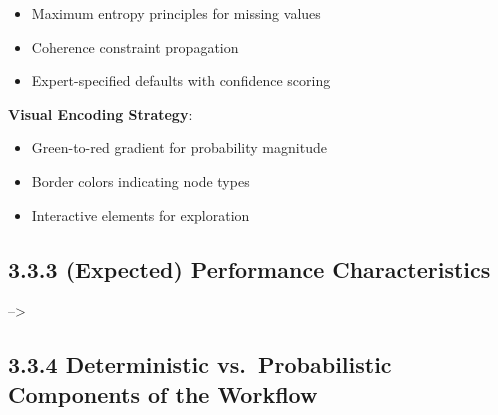 \documentclass[
  11pt,
  letterpaper,
]{book}
\providecommand{\tightlist}{%
  \setlength{\itemsep}{0pt}\setlength{\parskip}{0pt}}
\begin{document}
\begin{itemize}
\tightlist
\item
  Maximum entropy principles for missing values
\item
  Coherence constraint propagation
\item
  Expert-specified defaults with confidence scoring
\end{itemize}

\textbf{Visual Encoding Strategy}:

\begin{itemize}
\tightlist
\item
  Green-to-red gradient for probability magnitude
\item
  Border colors indicating node types
\item
  Interactive elements for exploration
\end{itemize}

\subsection*{3.3.3 (Expected) Performance
Characteristics}\label{sec-performance}

--\textgreater{}

\subsection*{3.3.4 Deterministic vs.~Probabilistic Components of the
Workflow}\label{deterministic-vs.-probabilistic-components-of-the-workflow}
\end{document}
